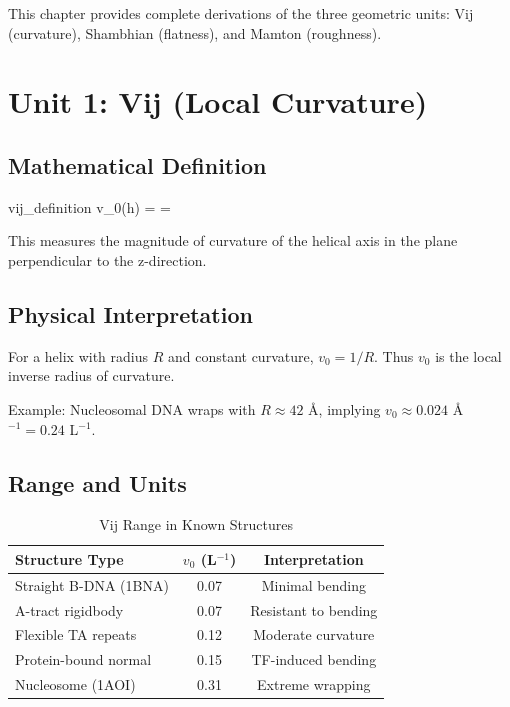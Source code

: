 

This chapter provides complete derivations of the three geometric units: Vij (curvature), Shambhian (flatness), and Mamton (roughness).

\section{Unit 1: Vij (Local Curvature)}

\subsection{Mathematical Definition}

\begin{keyresult}
\begin{beq}{vij_definition}
    v_0(h) =  = 
\end{beq}

This measures the magnitude of curvature of the helical axis in the plane perpendicular to the z-direction.
\end{keyresult}

\subsection{Physical Interpretation}

For a helix with radius $R$ and constant curvature, $v_0 = 1/R$. Thus $v_0$ is the local inverse radius of curvature.

Example: Nucleosomal DNA wraps with $R \approx 42$ \AA \citep{Luger1997}, implying $v_0 \approx 0.024$ \AA$^{-1} = 0.24$ L$^{-1}$.

\subsection{Range and Units}

\begin{table}[h]
    \centering
    \caption{Vij Range in Known Structures}
    \begin{tabular}{lcc}
        \toprule
        \textbf{Structure Type} & \textbf{$v_0$ (L$^{-1}$)} & \textbf{Interpretation} \\
        \midrule
        Straight B-DNA (1BNA) & 0.07 & Minimal bending \\
        A-tract rigidbody & 0.07 & Resistant to bending \\
        Flexible TA repeats & 0.12 & Moderate curvature \\
        Protein-bound normal & 0.15 & TF-induced bending \\
        Nucleosome (1AOI) & 0.31 & Extreme wrapping \\
        \bottomrule
    \end{tabular}
\end{table}

